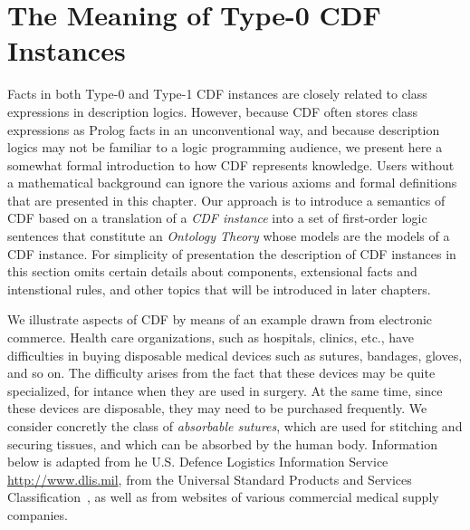 \chapter{The Meaning of Type-0 CDF Instances}
\label{chap:type0} 


Facts in both Type-0 and Type-1 CDF instances are closely related to
class expressions in description logics.  However, because CDF often
stores class expressions as Prolog facts in an unconventional way, and
because description logics may not be familiar to a logic programming
audience, we present here a somewhat formal introduction to how CDF
represents knowledge.  Users without a mathematical background can
ignore the various axioms and formal definitions that are presented in
this chapter.  Our approach is to introduce a semantics of CDF based
on a translation of a {\em CDF instance} into a set of first-order
logic sentences that constitute an {\em Ontology Theory} whose models
are the models of a CDF instance.  For simplicity of presentation the
description of CDF instances in this section omits certain details
about components, extensional facts and intenstional rules, and other
topics that will be introduced in later chapters.

We illustrate aspects of CDF by means of an example drawn from
electronic commerce.  Health care organizations, such as hospitals,
clinics, etc., have difficulties in buying disposable medical devices
such as sutures, bandages, gloves, and so on.  The difficulty arises
from the fact that these devices may be quite specialized, for intance
when they are used in surgery.  At the same time, since these devices
are disposable, they may need to be purchased frequently.  We consider
concretly the class of {\em absorbable sutures}, which are used for
stitching and securing tissues, and which can be absorbed by the human
body.  Information below is adapted from he U.S. Defence Logistics
Information Service \url{http://www.dlis.mil}, from the Universal
Standard Products and Services Classification~\cite{UNSPSC}, as well
as from websites of various commercial medical supply companies.

